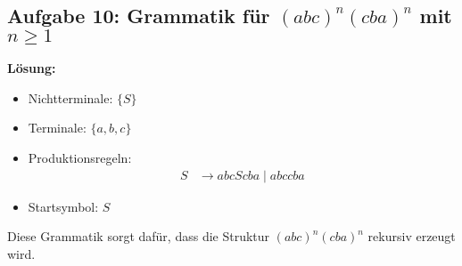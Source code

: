 \documentclass[a4paper,12pt]{article}
\begin{document}
	\subsection*{Aufgabe 10: Grammatik für $(abc)^n (cba)^n$ mit $n \geq 1$}
	\textbf{Lösung:}
	\begin{itemize}
		\item Nichtterminale: $\{S\}$
		\item Terminale: $\{a, b, c\}$
		\item Produktionsregeln:
		\begin{align*}
			S &\rightarrow abc S cba \mid abc cba
		\end{align*}
		\item Startsymbol: $S$
	\end{itemize}
	Diese Grammatik sorgt dafür, dass die Struktur $(abc)^n (cba)^n$ rekursiv erzeugt wird.
	
	
\end{document}
